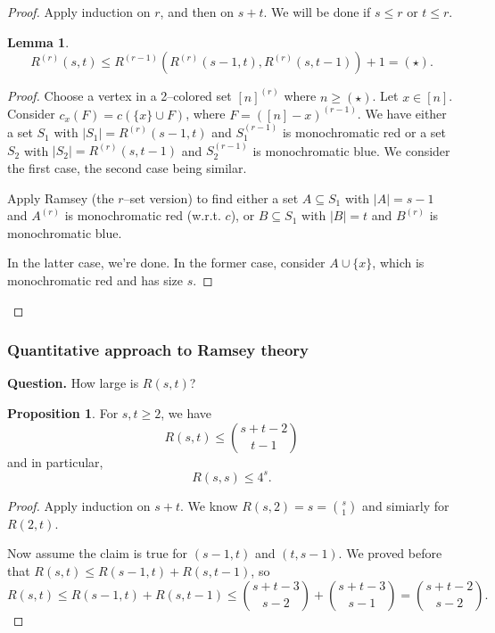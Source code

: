 \documentclass{article}
\theoremstyle{definition}
\newtheorem{lemma}[theorem]{Lemma}
\newtheorem{prop}[theorem]{Proposition}
\begin{document}
\begin{proof}
    Apply induction on $r$, and then on $s+t$. We will be done if $s\le r$ or $t\le r$.

    \begin{lemma}
        $$R^{(r)}(s,t)\le R^{(r-1)}(R^{(r)}(s-1,t),R^{(r)}(s,t-1))+1 = (\star).$$
    \end{lemma}
    \begin{proof}
        Choose a vertex in a 2--colored set $[n]^{(r)}$ where $n\ge (\star)$. Let $x \in [n]$. Consider $c_x(F) = c(\{x\} \cup F)$, where $F = ([n]-x)^{(r-1)}$. We have either a set $S_1$ with $|S_1|=R^{(r)}(s-1,t)$ and $S_1^{(r-1)}$ is monochromatic red or a set $S_2$ with $|S_2| = R^{(r)}(s,t-1)$ and $S_2^{(r-1)}$ is monochromatic blue. We consider the first case, the second case being similar.

        Apply Ramsey (the $r$--set version) to find either a set $A \subseteq S_1$ with $|A|=s-1$ and $A^{(r)}$ is monochromatic red (w.r.t. $c$), or $B \subseteq S_1$ with $|B|=t$ and $B^{(r)}$ is monochromatic blue. 

        In the latter case, we're done. In the former case, consider $A \cup \{x\}$, which is monochromatic red and has size $s$.
    \end{proof} 
\end{proof}

\subsubsection*{Quantitative approach to Ramsey theory}

\textbf{Question.} How large is $R(s,t)$?
\begin{prop}
    For $s,t\ge 2$, we have \[
    R(s,t) \le {{s+t-2}\choose{t-1}}
    \]
    and in particular, \[
    R(s,s)\le 4^s.
    \]
\end{prop}
\begin{proof}
    Apply induction on $s+t$. We know $R(s,2)=s={s\choose{1}}$ and simiarly for $R(2,t)$.

    Now assume the claim is true for $(s-1,t)$ and $(t,s-1)$. We proved before that $R(s,t)\le R(s-1,t)+R(s,t-1)$, so
    \[
        R(s,t)\le R(s-1,t)+R(s,t-1) \le {{s+t-3}\choose{s-2}} + {{s+t-3}\choose{s-1}} = {{s+t-2}\choose{s-2}}.
    \]
\end{proof}
\end{document}
